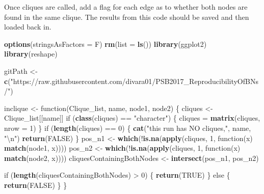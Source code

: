 \documentclass[]{article}
\newenvironment{Shaded}{\begin{snugshade}}{\end{snugshade}}
\newcommand{\KeywordTok}[1]{\textcolor[rgb]{0.13,0.29,0.53}{\textbf{{#1}}}}
\newcommand{\DataTypeTok}[1]{\textcolor[rgb]{0.13,0.29,0.53}{{#1}}}
\newcommand{\DecValTok}[1]{\textcolor[rgb]{0.00,0.00,0.81}{{#1}}}
\newcommand{\CharTok}[1]{\textcolor[rgb]{0.31,0.60,0.02}{{#1}}}
\newcommand{\StringTok}[1]{\textcolor[rgb]{0.31,0.60,0.02}{{#1}}}
\newcommand{\OtherTok}[1]{\textcolor[rgb]{0.56,0.35,0.01}{{#1}}}
\newcommand{\NormalTok}[1]{{#1}}
\begin{document}
Once cliques are called, add a flag for each edge as to whether both
nodes are found in the same clique. The results from this code should be
saved and then loaded back in.

\begin{Shaded}
\begin{Highlighting}[]
\KeywordTok{options}\NormalTok{(}\DataTypeTok{stringsAsFactors =} \NormalTok{F)}
\KeywordTok{rm}\NormalTok{(}\DataTypeTok{list =} \KeywordTok{ls}\NormalTok{())}
\KeywordTok{library}\NormalTok{(ggplot2)}
\KeywordTok{library}\NormalTok{(reshape)}

\NormalTok{gitPath <-}\StringTok{ }\KeywordTok{c}\NormalTok{(}\StringTok{"https://raw.githubusercontent.com/divara01/PSB2017_ReproducibilityOfBNs/"}\NormalTok{)}

\NormalTok{inclique <-}\StringTok{ }\NormalTok{function(Clique_list, name, node1, node2) \{}
    \NormalTok{cliques <-}\StringTok{ }\NormalTok{Clique_list[[name]]}
    \NormalTok{if (}\KeywordTok{class}\NormalTok{(cliques) ==}\StringTok{ "character"}\NormalTok{) \{}
        \NormalTok{cliques =}\StringTok{ }\KeywordTok{matrix}\NormalTok{(cliques, }\DataTypeTok{nrow =} \DecValTok{1}\NormalTok{)}
    \NormalTok{\}}
    \NormalTok{if (}\KeywordTok{length}\NormalTok{(cliques) ==}\StringTok{ }\DecValTok{0}\NormalTok{) \{}
        \KeywordTok{cat}\NormalTok{(}\StringTok{"this run has NO cliques,"}\NormalTok{, name, }\StringTok{"}\CharTok{\textbackslash{}n}\StringTok{"}\NormalTok{)}
        \KeywordTok{return}\NormalTok{(}\OtherTok{FALSE}\NormalTok{)}
    \NormalTok{\}}
    \NormalTok{pos_n1 <-}\StringTok{ }\KeywordTok{which}\NormalTok{(!}\KeywordTok{is.na}\NormalTok{(}\KeywordTok{apply}\NormalTok{(cliques, }\DecValTok{1}\NormalTok{, function(x) }\KeywordTok{match}\NormalTok{(node1, }
        \NormalTok{x))))}
    \NormalTok{pos_n2 <-}\StringTok{ }\KeywordTok{which}\NormalTok{(!}\KeywordTok{is.na}\NormalTok{(}\KeywordTok{apply}\NormalTok{(cliques, }\DecValTok{1}\NormalTok{, function(x) }\KeywordTok{match}\NormalTok{(node2, }
        \NormalTok{x))))}
    \NormalTok{cliquesContainingBothNodes <-}\StringTok{ }\KeywordTok{intersect}\NormalTok{(pos_n1, pos_n2)}
    
    \NormalTok{if (}\KeywordTok{length}\NormalTok{(cliquesContainingBothNodes) >}\StringTok{ }\DecValTok{0}\NormalTok{) \{}
        \KeywordTok{return}\NormalTok{(}\OtherTok{TRUE}\NormalTok{)}
    \NormalTok{\} else \{}
        \KeywordTok{return}\NormalTok{(}\OtherTok{FALSE}\NormalTok{)}
    \NormalTok{\}}
\NormalTok{\}}


\end{Highlighting}
\end{Shaded}
\end{document}
